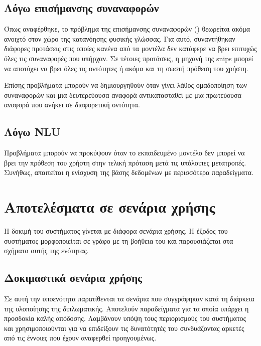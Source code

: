 \subsection{Λόγω επισήμανσης συναναφορών}
Όπως αναφέρθηκε, το πρόβλημα της επισήμανσης συναναφορών () θεωρείται ακόμα ανοιχτό στον χώρο της κατανόησης φυσικής γλώσσας.
Για αυτό, συναντήθηκαν διάφορες προτάσεις στις οποίες κανένα από τα μοντέλα δεν κατάφερε να βρει επιτυχώς όλες τις συναναφορές που υπήρχαν.
Σε τέτοιες προτάσεις, η μηχανή της snips μπορεί να αποτύχει να βρει όλες τις οντότητες ή ακόμα και τη σωστή πρόθεση του χρήστη.

Επίσης προβλήματα μπορούν να δημιουργηθούν όταν γίνει λάθος ομαδοποίηση των συναναφορών και μια δευτερεύουσα αναφορά αντικατασταθεί με μια πρωτεύουσα αναφορά που ανήκει σε διαφορετική οντότητα.

\subsection{Λόγω NLU}
Προβλήματα μπορούν να προκύψουν όταν το εκπαιδευμένο μοντέλο \NLU{} δεν μπορεί να βρει την πρόθεση του χρήστη στην τελική πρόταση μετά τις υπόλοιπες μετατροπές.
Συνήθως, απαιτείται η ενίσχυση της βάσης δεδομένων με περισσότερα παραδείγματα.

\section{Αποτελέσματα σε σενάρια χρήσης}
Η δοκιμή του συστήματος γίνεται με διάφορα σενάρια χρήσης.
Η έξοδος του συστήματος μορφοποιείται σε γράφο με τη βοήθεια του  και παρουσιάζεται στα σχήματα αυτής της ενότητας.

\subsection{Δοκιμαστικά σενάρια χρήσης}
Σε αυτή την υποενότητα παρατίθενται τα σενάρια που συγγράφηκαν κατά τη διάρκεια της υλοποίησης της διπλωματικής.
Αποτελούν παραδείγματα για τα οποία υπάρχει η προσδοκία καλής απόδοσης.
Λαμβάνουν υπόψη τους περιορισμούς του συστήματος και χρησιμοποιούνται για να επιδείξουν τις δυνατότητές του συνδυάζοντας αρκετές από τις έννοιες που έχουν αναφερθεί προηγουμένως.

